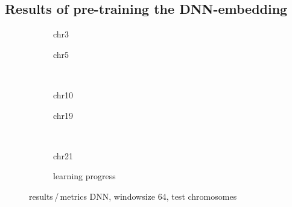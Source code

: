 \subsection{Results of pre-training the DNN-embedding} \label{sec:appendix:pretraining_results}
\begin{figure}[h!] %
    \begin{subfigure}{0.45\textwidth}
        \scriptsize
        \caption{chr3}
    \end{subfigure} \hfill
    \begin{subfigure}{0.45\textwidth}
        \scriptsize
        \caption{chr5}
    \end{subfigure}\\[5mm]
    \begin{subfigure}{0.45\textwidth}
        \scriptsize
        \caption{chr10}
    \end{subfigure}\hfill
    \begin{subfigure}{0.45\textwidth}
        \scriptsize
        \caption{chr19}
    \end{subfigure}\\[3mm]
    \centering
    \begin{subfigure}{0.45\textwidth}
        \scriptsize
        \caption{chr21}
    \end{subfigure} \hfill
    \begin{subfigure}{0.45\textwidth}
        \scriptsize
        \caption{learning progress} \label{fig:results:DNN64_lossEpochs}
    \end{subfigure}
    \caption{results\,/\,metrics DNN, windowsize 64, test chromosomes}   \label{fig:results:DNN64_pearson}
\end{figure}
